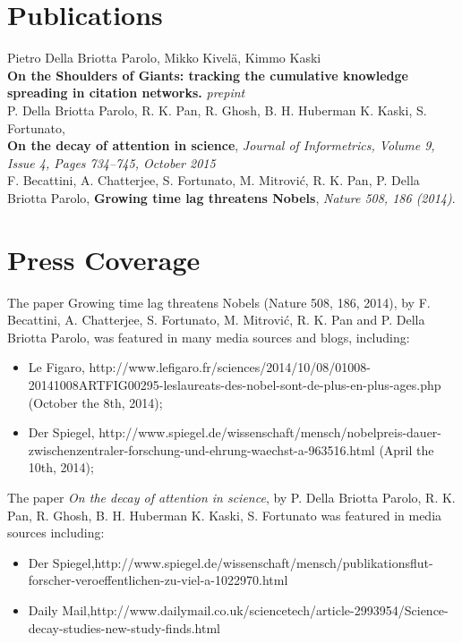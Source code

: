 \documentclass[]{friggeri-cv}
\begin{document}
\section{Publications}

 Pietro Della Briotta Parolo, Mikko Kivel\"a, Kimmo Kaski\\
\textbf{On the Shoulders of
Giants: tracking the cumulative knowledge spreading in citation networks.}
\emph{prepint}
\\
P. Della Briotta Parolo, R. K. Pan, R. Ghosh, B. H. Huberman
K. Kaski, S. Fortunato, \\
\textbf{On the decay of attention in science}, 
\emph {Journal of Informetrics, Volume 9, Issue 4,  Pages 734–745, October 2015}
\\
F. Becattini, A. Chatterjee, S. Fortunato, M. Mitrović, R. K. Pan, P.
Della Briotta Parolo,
\textbf{Growing time lag threatens Nobels}, 
\emph{Nature 508, 186 (2014)}.
\\

\section{Press Coverage}

The paper Growing time lag threatens Nobels (Nature 508, 186, 2014), by F. Becattini, A.
Chatterjee, S. Fortunato, M. Mitrović, R. K. Pan and P. Della Briotta Parolo, was featured in many
media sources and blogs, including:

\begin{itemize}
\item Le Figaro, http://www.lefigaro.fr/sciences/2014/10/08/01008-20141008ARTFIG00295-leslaureats-des-nobel-sont-de-plus-en-plus-ages.php
(October the 8th, 2014);
\item Der Spiegel, http://www.spiegel.de/wissenschaft/mensch/nobelpreis-dauer-zwischenzentraler-forschung-und-ehrung-waechst-a-963516.html
(April the 10th, 2014);
\end{itemize}

The paper \textit{On the decay of attention in science}, by P. Della Briotta Parolo, R. K. Pan, R. Ghosh, B. H. Huberman
K. Kaski, S. Fortunato was featured in media sources including:
\begin{itemize}
\item Der Spiegel,​ http://www.spiegel.de/wissenschaft/mensch/publikationsflut-forscher-veroeffentlichen-zu-viel-a-1022970.html
\item Daily Mail, ​http://www.dailymail.co.uk/sciencetech/article-2993954/Science-decay-studies-new-study-finds.html​
\end{itemize}
\end{document}

